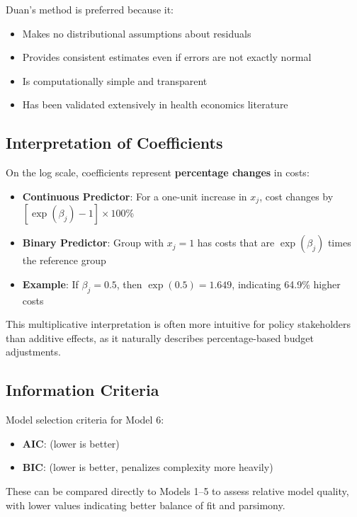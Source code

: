 Duan's method is preferred because it:
\begin{itemize}
    \item Makes no distributional assumptions about residuals
    \item Provides consistent estimates even if errors are not exactly normal
    \item Is computationally simple and transparent
    \item Has been validated extensively in health economics literature
\end{itemize}

\subsection{Interpretation of Coefficients}

On the log scale, coefficients represent \textbf{percentage changes} in costs:

\begin{itemize}
    \item \textbf{Continuous Predictor}: For a one-unit increase in $x_j$, cost changes by $[\exp(\beta_j) - 1] \times 100$\%
    \item \textbf{Binary Predictor}: Group with $x_j = 1$ has costs that are $\exp(\beta_j)$ times the reference group
    \item \textbf{Example}: If $\beta_j = 0.5$, then $\exp(0.5) = 1.649$, indicating 64.9\% higher costs
\end{itemize}

This multiplicative interpretation is often more intuitive for policy stakeholders than additive effects, as it naturally describes percentage-based budget adjustments.

\subsection{Information Criteria}

Model selection criteria for Model 6:

\begin{itemize}
    \item \textbf{AIC}: \ModelSixAIC{} (lower is better)
    \item \textbf{BIC}: \ModelSixBIC{} (lower is better, penalizes complexity more heavily)
\end{itemize}

These can be compared directly to Models 1--5 to assess relative model quality, with lower values indicating better balance of fit and parsimony.

